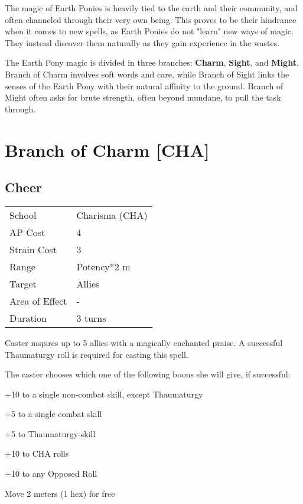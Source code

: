 \documentclass[11pt,a4paper,twocolumn]{book}
\begin{document}
The magic of Earth Ponies is heavily tied to the earth and their community, and often channeled through their very own being. This proves to be their hindrance when it comes to new spells, as Earth Ponies do not "learn" new ways of magic. They instead discover them naturally as they gain experience in the wastes.

The Earth Pony magic is divided in three branches: \textbf{Charm}, \textbf{Sight}, and \textbf{Might}. Branch of Charm involves soft words and care, while Branch of Sight links the senses of the Earth Pony with their natural affinity to the ground. Branch of Might often asks for brute strength, often beyond mundane, to pull the task through.

\vfill
\section*{Branch of Charm [CHA]}
\subsection*{Cheer}
{
	\begin{tabu} to 75mm{| X[l,4] | X[l,7] |}
		\hline
		School 			& Charisma (CHA) 	\\
		AP Cost	      	& 4 				\\
		Strain Cost     & 3 				\\
		Range     		& Potency*2 m 		\\
		Target      	& Allies 			\\
		Area of Effect  & -	 			\\
		Duration     	& 3 turns 			\\ \hline
	\end{tabu}
	
}

\medskip

Caster inspires up to 5 allies with a magically enchanted praise. A successful Thaumaturgy roll is required for casting this spell.

The caster chooses which one of the following boons she will give, if successful:

\medskip
\begin{compactitem}
	\item +10 to a single non-combat skill, except Thaumaturgy
	\item +5 to a single combat skill
	\item +5 to Thaumaturgy-skill
	\item +10 to CHA rolls
	\item +10 to any Opposed Roll
	\item Move 2 meters (1 hex) for free
\end{compactitem}
\end{document}

